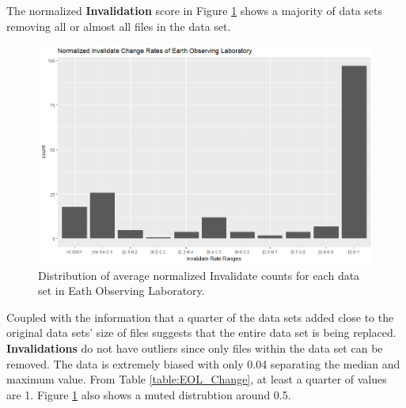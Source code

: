The normalized \textbf{Invalidation} score in Figure \ref{EOL_Invs} shows a majority of data sets removing all or almost all files in the data set.
\begin{figure}%
	\centering
	\includegraphics[scale=.6]{figures/Eol_Inv.png}
	\caption{Distribution of average normalized Invalidate counts for each data set in Eath Observing Laboratory.}
	\label{EOL_Invs}
\end{figure}
Coupled with the information that a quarter of the data sets added close to the original data sets' size of files suggests that the entire data set is being replaced.
\textbf{Invalidations} do not have outliers since only files within the data set can be removed.
The data is extremely biased with only 0.04 separating the median and maximum value.
From Table \ref{table:EOL_Change}, at least a quarter of values are 1.
Figure \ref{EOL_Invs} also shows a muted distrubtion around 0.5.


